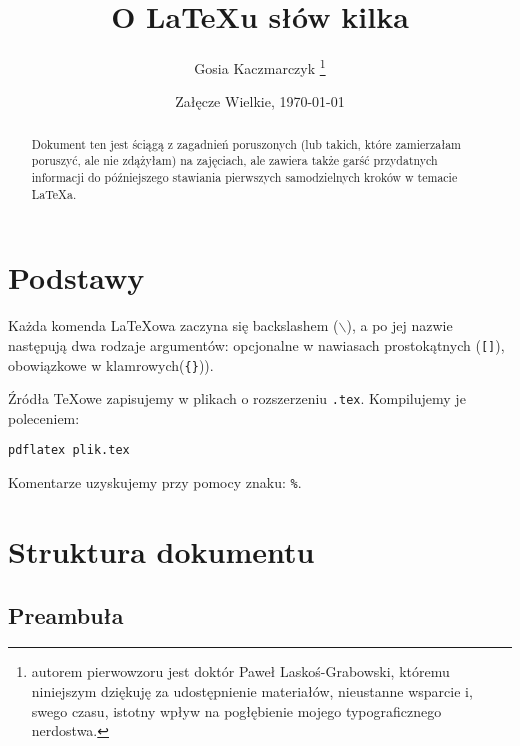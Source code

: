 \documentclass[11pt,a4paper]{article}
\author{Gosia Kaczmarczyk \thanks{autorem pierwowzoru jest doktór Paweł Laskoś-Grabowski, któremu niniejszym dziękuję za udostępnienie materiałów, nieustanne wsparcie i, swego czasu, istotny wpływ na pogłębienie mojego typograficznego nerdostwa.}}
\title{O \LaTeX u słów kilka}
\date{Załęcze Wielkie, \today}
\begin{document}
\maketitle


\begin{abstract}
Dokument ten jest ściągą z zagadnień poruszonych (lub takich, które zamierzałam poruszyć, ale nie zdążyłam) na zajęciach, ale zawiera także garść przydatnych informacji do późniejszego stawiania pierwszych samodzielnych kroków w temacie \LaTeX a. 
\end{abstract}


\section{Podstawy}

Każda komenda \LaTeX owa zaczyna się backslashem ($\mathtt{\backslash}$), a po jej nazwie następują dwa rodzaje argumentów: opcjonalne w nawiasach prostokątnych (\texttt{[]}), obowiązkowe w klamrowych(\texttt{\{\}})). 

Źródła \TeX owe zapisujemy w plikach o rozszerzeniu \texttt{.tex}. Kompilujemy je poleceniem: \begin{verbatim}pdflatex plik.tex\end{verbatim}

Komentarze uzyskujemy przy pomocy znaku: \verb+%+.

\section{Struktura dokumentu}

\subsection{Preambuła}
\end{document}
